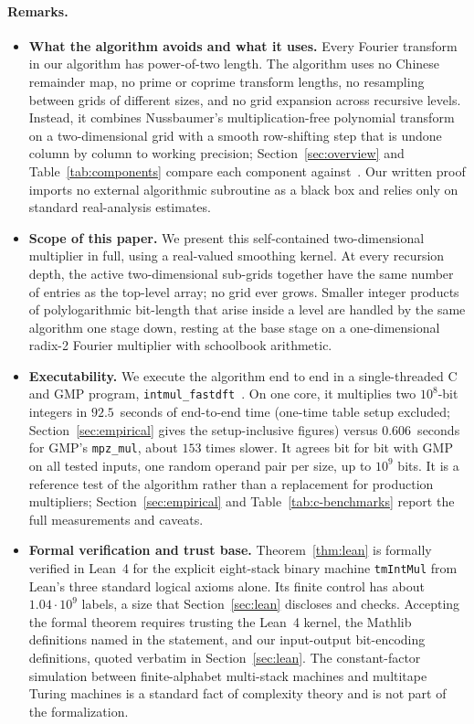 \paragraph{Remarks.}
\begin{itemize}[leftmargin=*,itemsep=2pt,parsep=0pt,topsep=3pt]
  \item \textbf{What the algorithm avoids and what it uses.} Every Fourier transform in our algorithm has power-of-two length. The algorithm uses no Chinese remainder map, no prime or coprime transform lengths, no resampling between grids of different sizes, and no grid expansion across recursive levels. Instead, it combines Nussbaumer's multiplication-free polynomial transform on a two-dimensional grid with a smooth row-shifting step that is undone column by column to working precision; Section~\ref{sec:overview} and Table~\ref{tab:components} compare each component against~\cite{HvdH21}. Our written proof imports no external algorithmic subroutine as a black box and relies only on standard real-analysis estimates.

  \item \textbf{Scope of this paper.} We present this self-contained two-dimensional multiplier in full, using a real-valued smoothing kernel. At every recursion depth, the active two-dimensional sub-grids together have the same number of entries as the top-level array; no grid ever grows. Smaller integer products of polylogarithmic bit-length that arise inside a level are handled by the same algorithm one stage down, resting at the base stage on a one-dimensional radix-2 Fourier multiplier with schoolbook arithmetic.

  \item \textbf{Executability.} We execute the algorithm end to end in a single-threaded C and GMP program, \texttt{intmul\_fastdft}~\cite{CGMP26}. On one core, it multiplies two $10^8$-bit integers in $92.5$~seconds of end-to-end time (one-time table setup excluded; Section~\ref{sec:empirical} gives the setup-inclusive figures) versus $0.606$~seconds for GMP's \texttt{mpz\_mul}, about $153$ times slower. It agrees bit for bit with GMP on all tested inputs, one random operand pair per size, up to $10^9$ bits. It is a reference test of the algorithm rather than a replacement for production multipliers; Section~\ref{sec:empirical} and Table~\ref{tab:c-benchmarks} report the full measurements and caveats.

  \item \textbf{Formal verification and trust base.} Theorem~\ref{thm:lean} is formally verified in Lean~4 for the explicit eight-stack binary machine \texttt{tmIntMul} from Lean's three standard logical axioms alone. Its finite control has about $1.04 \cdot 10^9$ labels, a size that Section~\ref{sec:lean} discloses and checks. Accepting the formal theorem requires trusting the Lean~4 kernel, the Mathlib definitions named in the statement, and our input-output bit-encoding definitions, quoted verbatim in Section~\ref{sec:lean}. The constant-factor simulation between finite-alphabet multi-stack machines and multitape Turing machines is a standard fact of complexity theory and is not part of the formalization.


\end{itemize}
